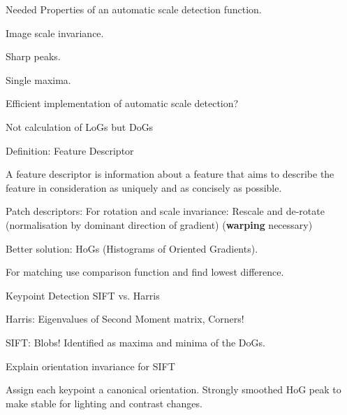 \documentclass[10pt,a4paper]{scrartcl}
\begin{document}
\begin{multicols*}{2}
\begin{QandA}
{Needed Properties of an automatic scale detection function.}
\item Image scale invariance.
\item Sharp peaks.
\item Single maxima.
\end{QandA} 

\begin{QandA}
{Efficient implementation of automatic scale detection?}
\item Not calculation of LoGs but DoGs
\end{QandA}

\begin{QandA}
{Definition: Feature Descriptor}
\item A feature descriptor is information about a feature that aims to describe the feature in consideration as uniquely and as concisely as possible.
\item Patch descriptors: For rotation and scale invariance: Rescale and de-rotate (normalisation by dominant direction of gradient) (\textbf{warping} necessary)
\item Better solution: HoGs (Histograms of Oriented Gradients).
\item For matching use comparison function and find lowest difference.
\end{QandA}  

\begin{QandA}
{Keypoint Detection SIFT vs. Harris}
\item Harris: Eigenvalues of Second Moment matrix, Corners!
\item SIFT: Blobs! Identified as maxima and minima of the DoGs.
\end{QandA}

\begin{QandA}
{Explain orientation invariance for SIFT}
\item Assign each keypoint a canonical orientation. Strongly smoothed HoG peak to make stable for lighting and contrast changes.
\end{QandA}


\end{multicols*}
\end{document}
